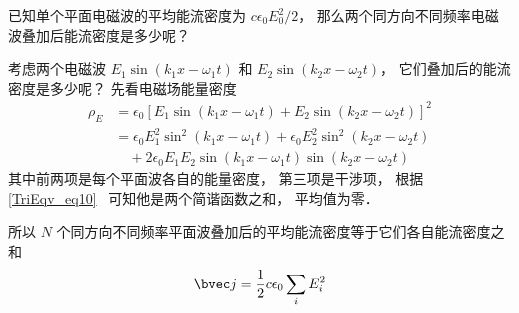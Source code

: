 

已知单个平面电磁波的平均能流密度为 $c\epsilon_0 E_0^2/2$， 那么两个同方向不同频率电磁波叠加后能流密度是多少呢？

考虑两个电磁波 $E_1 \sin(k_1 x - \omega_1 t)$ 和 $E_2 \sin(k_2x - \omega_2 t)$， 它们叠加后的能流密度是多少呢？ 先看电磁场能量密度
\begin{equation}
\begin{aligned}
\rho_E &= \epsilon_0 [E_1 \sin(k_1 x - \omega_1 t) + E_2 \sin(k_2x - \omega_2 t)]^2\\
&= \epsilon_0 E_1^2 \sin^2(k_1 x - \omega_1 t) + \epsilon_0 E_2^2 \sin^2(k_2x - \omega_2 t)\\
&\quad  + 2\epsilon_0 E_1 E_2 \sin(k_1 x - \omega_1 t) \sin(k_2x - \omega_2 t)
\end{aligned}
\end{equation}
其中前两项是每个平面波各自的能量密度， 第三项是干涉项， 根据\autoref{TriEqv_eq10}~ 可知他是两个简谐函数之和， 平均值为零．

所以 $N$ 个同方向不同频率平面波叠加后的平均能流密度等于它们各自能流密度之和
\begin{equation}
\bvec j = \frac{1}{2}c\epsilon_0 \sum_i E_i^2
\end{equation}
